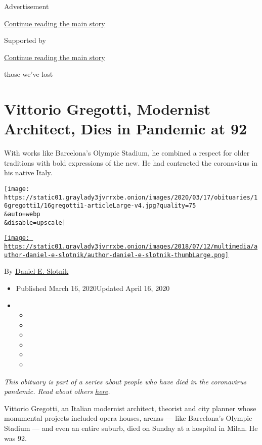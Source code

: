 Advertisement

\protect\hyperlink{after-top}{Continue reading the main story}

Supported by

\protect\hyperlink{after-sponsor}{Continue reading the main story}

those we've lost

\hypertarget{vittorio-gregotti-modernist-architect-dies-in-pandemic-at-92}{%
\section{Vittorio Gregotti, Modernist Architect, Dies in Pandemic at
92}\label{vittorio-gregotti-modernist-architect-dies-in-pandemic-at-92}}

With works like Barcelona's Olympic Stadium, he combined a respect for
older traditions with bold expressions of the new. He had contracted the
coronavirus in his native Italy.

\texttt{[image: https://static01.graylady3jvrrxbe.onion/images/2020/03/17/obituaries/16gregotti1/16gregotti1-articleLarge-v4.jpg?quality=75\\\&auto=webp\\\&disable=upscale]}

\href{https://www.nytimes3xbfgragh.onion/by/daniel-e-slotnik}{\texttt{[image: https://static01.graylady3jvrrxbe.onion/images/2018/07/12/multimedia/author-daniel-e-slotnik/author-daniel-e-slotnik-thumbLarge.png]}}

By \href{https://www.nytimes3xbfgragh.onion/by/daniel-e-slotnik}{Daniel
E. Slotnik}

\begin{itemize}
\item
  Published March 16, 2020Updated April 16, 2020
\item
  \begin{itemize}
  \item
  \item
  \item
  \item
  \item
  \item
  \end{itemize}
\end{itemize}

\emph{This obituary is part of a series about people who have died in
the coronavirus pandemic. Read about others}
\href{https://www.nytimes3xbfgragh.onion/series/people-who-have-died-of-the-coronavirus}{\emph{here}}\emph{.}

Vittorio Gregotti, an Italian modernist architect, theorist and city
planner whose monumental projects included opera houses, arenas --- like
Barcelona's Olympic Stadium --- and even an entire suburb, died on
Sunday at a hospital in Milan. He was 92.

